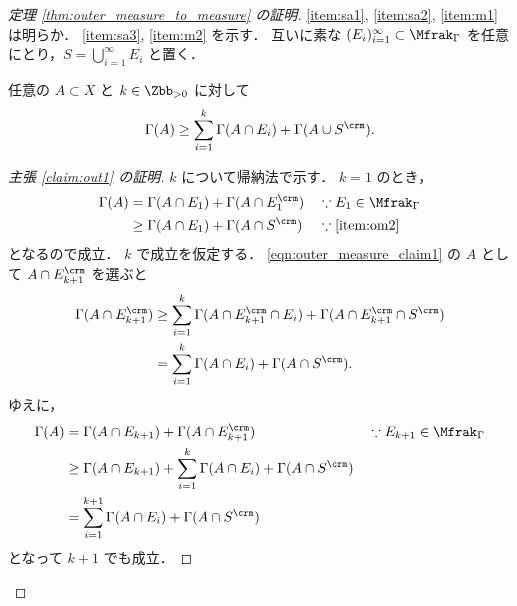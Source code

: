 \begin{proof}[定理 \ref{thm:outer_measure_to_measure} の証明]
    \ref{item:sa1}, \ref{item:sa2}, \ref{item:m1} は明らか．
    \ref{item:sa3}, \ref{item:m2} を示す．
    互いに素な $(E_i)_{i=1}^\infty\subset\Mfrak_\Gamma$ を任意にとり，$S=\bigcup_{i=1}^\infty E_i$ と置く．

    \begin{claim}\label{claim:out1}
        任意の $A\subset X$ と $k\in\Zbb_{>0}$ に対して
        \begin{align}
            \Gamma(A)\ge\sum_{i=1}^k\Gamma(A\cap E_i)+\Gamma(A\cup S^\crm).
            \label{eqn:outer_measure_claim1}
        \end{align}
    \end{claim}

    \begin{proof}[主張 \ref{claim:out1} の証明]
        $k$ について帰納法で示す．
        $k=1$ のとき，
        \begin{align*}
            \Gamma(A)
            &=\Gamma(A\cap E_1)+\Gamma(A\cap E_1^\crm)&&\because E_1\in\Mfrak_\Gamma\\
            &\ge\Gamma(A\cap E_1)+\Gamma(A\cap S^\crm)&&\because\text{\ref{item:om2}}
        \end{align*}
        となるので成立．
        $k$ で成立を仮定する．
        \eqref{eqn:outer_measure_claim1} の $A$ として $A\cap E_{k+1}^\crm$ を選ぶと
        \begin{align*}
            \Gamma(A\cap E_{k+1}^\crm)
            &\ge\sum_{i=1}^k\Gamma(A\cap E_{k+1}^\crm\cap E_i)+\Gamma(A\cap E_{k+1}^\crm\cap S^\crm)\\
            &=\sum_{i=1}^k\Gamma(A\cap E_i)+\Gamma(A\cap S^\crm).
        \end{align*}
        ゆえに，
        \begin{align*}
            \Gamma(A)
            &=\Gamma(A\cap E_{k+1})+\Gamma(A\cap E_{k+1}^\crm)&&\because E_{k+1}\in\Mfrak_\Gamma\\
            &\ge\Gamma(A\cap E_{k+1})+\sum_{i=1}^k\Gamma(A\cap E_i)+\Gamma(A\cap S^\crm)\\
            &=\sum_{i=1}^{k+1}\Gamma(A\cap E_i)+\Gamma(A\cap S^\crm)
        \end{align*}
        となって $k+1$ でも成立．
    \end{proof}


\end{proof}
